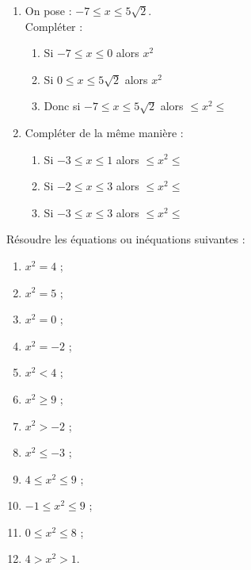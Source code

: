\begin{exo}
 \vspace{-1em}\begin{multicols}{2}
  \begin{enumerate}
   \item On pose : $-7 \leqslant x \leqslant 5\sqrt{2}$. \\ Compl\'eter :
	\begin{enumerate}
	  \item Si $-7 \leqslant x \leqslant 0 $ alors \dotfill $x^2$ \dotfill
	  \item Si $0 \leqslant x \leqslant 5\sqrt{2}$ alors \dotfill $x^2$ \dotfill
	  \item Donc si $-7\leqslant x \leqslant 5\sqrt{2}$ alors \dotfill $\leqslant x^2 \leqslant$ \dotfill
	\end{enumerate}
 \item Compl\'eter de la m\^eme mani\`ere :
	\begin{enumerate}
	  \item Si $-3\leqslant x \leqslant 1$ alors \dotfill $\leqslant x^2 \leqslant$ \dotfill
	  \item Si $-2\leqslant x \leqslant 3$ alors \dotfill $\leqslant x^2 \leqslant$ \dotfill
	  \item Si $-3\leqslant x \leqslant 3$ alors \dotfill $\leqslant x^2 \leqslant$ \dotfill
	\end{enumerate}
\end{enumerate}\end{multicols}\vspace{-1em}
\end{exo}

\begin{exo}
 R\'esoudre les \'equations ou in\'equations suivantes :
 \vspace{-1em}\begin{multicols}{3}\begin{enumerate}
  \item $x^2=4$ ;
  \item $x^2=5$ ;
  \item $x^2=0$ ;
  \item $x^2=-2$ ;
  \item $x^2<4$ ;
  \item $x^2\geqslant 9$ ;
  \item $x^2>-2$ ;
  \item $x^2\leqslant -3$ ;
  \item $4\leqslant x^2 \leqslant 9$ ;
\item $-1\leqslant x^2\leqslant 9$ ;
\item $0\leqslant x^2 \leqslant 8$ ;
\item $4> x^2 > 1$.
 \end{enumerate}\end{multicols}\vspace{-1em}
\end{exo}

